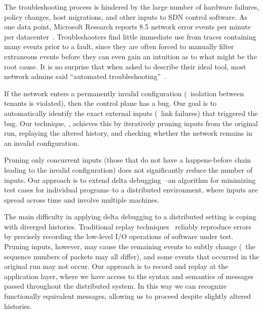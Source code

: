 The troubleshooting process is hindered by the large number of hardware failures,
policy changes, host migrations, and other inputs to SDN control software.
As one data point, Microsoft Research
reports 8.5 network error events per minute per
datacenter~\cite{Greenberg:2009:VSF:1592568.1592576}.
Troubleshooters find little immediate use from traces containing many events
prior to a fault,
since they are often forced to manually filter extraneous events
before they can even gain an intuition as to what might be the root cause.
It is no surprise that when asked to describe their
ideal tool, most network admins said ``automated troubleshooting''~\cite{Zeng:Survey}.


If the network enters a permanently invalid configuration (\eg~isolation between tenants
is violated), then the control plane has a bug. Our goal is
to automatically identify the exact external inputs (\eg~link failures) that
triggered the bug. Our technique, \simulator, achieves this by iteratively
pruning inputs from the original run, replaying the altered history, and
checking whether the network remains in an invalid configuration.

Pruning only concurrent inputs (those that do not have a
happens-before chain~\cite{Lamport:1978:TCO:359545.359563} leading to the
invalid configuration) does not significantly reduce the number of inputs.
Our approach is to extend delta debugging~\cite{Zeller:2002:SIF:506201.506206}--an algorithm for
minimizing test cases for individual programs--to a distributed environment, where inputs
are spread across time and involve multiple machines.

The main difficulty in applying delta debugging to a distributed
setting is coping with diverged histories. Traditional replay
techniques~\cite{Dunlap:2002:REI:844128.844148,Geels:2006:RDD:1267359.1267386}
reliably reproduce errors by precisely recording the low-level I/O operations of
software under test. Pruning inputs, however, may cause the remaining events to
subtly change (\eg~the sequence numbers of packets may all differ), and some
events that occurred in the original
run may not occur. Our approach is to record and replay at the application layer,
where we have access to the syntax and semantics of messages passed
throughout the distributed system. In this way we can recognize functionally
equivalent messages, allowing us to proceed despite slightly altered histories.

